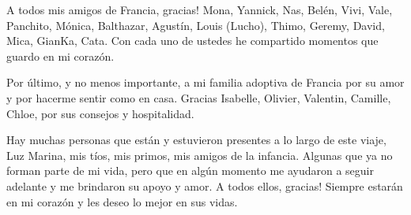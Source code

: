A todos mis amigos de Francia, gracias!
Mona, Yannick, Nas, Belén, Vivi, Vale, Panchito, Mónica, Balthazar, Agustín, 
Louis (Lucho), Thimo, Geremy, David, Mica, GianKa, Cata. 
Con cada uno de ustedes he compartido momentos que 
guardo en mi corazón.


Por último, y no menos importante, a mi familia adoptiva de Francia
por su amor y por hacerme sentir como en casa. Gracias Isabelle, Olivier, 
Valentin, Camille, Chloe, por sus consejos y hospitalidad.


Hay muchas personas que están y estuvieron presentes a lo largo de este viaje, 
Luz Marina, mis tíos, mis primos, mis amigos de la infancia. 
Algunas que ya no forman parte de mi vida, pero que en algún momento
me ayudaron a seguir adelante y me brindaron su apoyo y amor. 
A todos ellos, gracias!
Siempre estarán en mi corazón y les deseo lo mejor en sus vidas.



